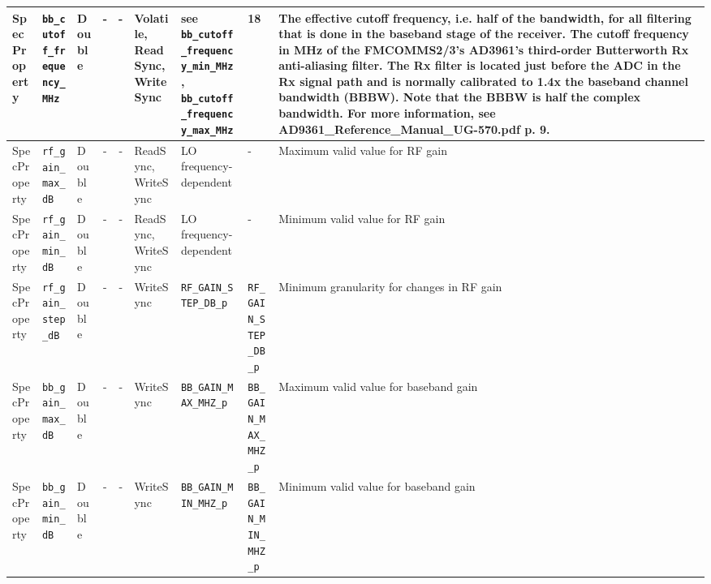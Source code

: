 \documentclass{article}
\begin{document}
\begin{landscape}
\begin{scriptsize}
\begin{longtable}{|p{1.8cm}|p{4.1cm}|p{1cm}|c|c|p{1.6cm}|p{3.7cm}|p{3.7cm}|p{2.5cm}|}
			SpecProperty & \verb+bb_cutoff_frequency_MHz+      & Double&-        & -          & Volatile, ReadSync, WriteSync      & see \verb+bb_cutoff_frequency_min_MHz+, \verb+bb_cutoff_frequency_max_MHz+         & 18      & The effective cutoff frequency, i.e. half of the bandwidth, for all filtering that is done in the baseband stage of the receiver. The cutoff frequency in MHz of the FMCOMMS2/3's AD3961's third-order Butterworth Rx anti-aliasing filter. The Rx filter is located just before the ADC in the Rx signal path and is normally calibrated to 1.4x the baseband channel bandwidth (BBBW). Note that the BBBW is half the complex bandwidth. For more information, see AD9361\_Reference\_Manual\_UG-570.pdf p. 9.                                                                                                                                  \\
			\hline
			SpecProperty & \verb+rf_gain_max_dB+               & Double& -        & -          & ReadSync, WriteSync & LO frequency-dependent & - & Maximum valid value for RF gain                                                                                                                                                                                             \\
			\hline
			SpecProperty & \verb+rf_gain_min_dB+               & Double& -        & -          & ReadSync, WriteSync & LO frequency-dependent & - & Minimum valid value for RF gain                                                                                                                                                                                             \\
			\hline
			SpecProperty & \verb+rf_gain_step_dB+              & Double& -        & -          & WriteSync      & \verb+RF_GAIN_STEP_DB_p+ & \verb+RF_GAIN_STEP_DB_p+ & Minimum granularity for changes in RF gain                                                                                                                                                                                  \\
			\hline
			SpecProperty & \verb+bb_gain_max_dB+               & Double& -        & -          & WriteSync      & \verb+BB_GAIN_MAX_MHZ_p+ & \verb+BB_GAIN_MAX_MHZ_p+ & Maximum valid value for baseband gain                                                                                                                                                                                       \\
			\hline
			SpecProperty & \verb+bb_gain_min_dB+               & Double& -        & -          & WriteSync      & \verb+BB_GAIN_MIN_MHZ_p+ & \verb+BB_GAIN_MIN_MHZ_p+ & Minimum valid value for baseband gain                                                                                                                                                                                       \\

\end{longtable}
\end{scriptsize}
\end{landscape}
\end{document}
